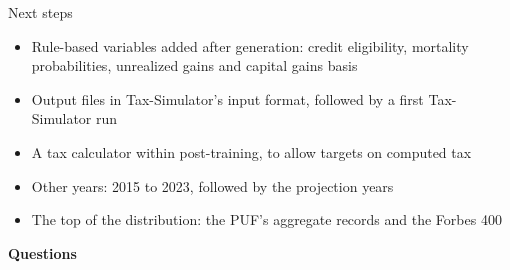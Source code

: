 \documentclass[11pt,aspectratio=169]{beamer}
\begin{document}
\begin{frame}{Next steps}
  \begin{itemize}
    \item Rule-based variables added after generation: credit eligibility, mortality probabilities,
          unrealized gains and capital gains basis
    \vspace{0.4em}
    \item Output files in Tax-Simulator's input format, followed by a first Tax-Simulator run
    \vspace{0.4em}
    \item A tax calculator within post-training, to allow targets on computed tax
    \vspace{0.4em}
    \item Other years: 2015 to 2023, followed by the projection years
    \vspace{0.4em}
    \item The top of the distribution: the PUF's aggregate records and the Forbes 400
  \end{itemize}
\end{frame}

\begin{frame}
  \begin{center}
    {\color{yaleblue}\Large\bfseries Questions}
  \end{center}
\end{frame}

\iffalse
\end{document}
